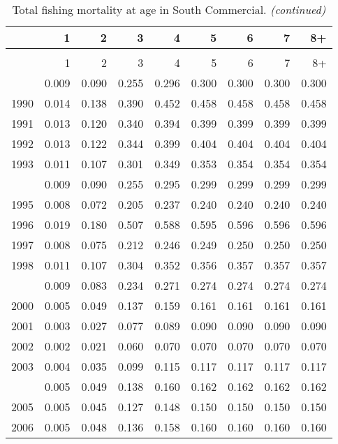 \documentclass[
]{article}
\begin{document}
\begin{longtable}[t]{lrrrrrrrr}
\caption{\label{tab:South_Commercial-fleet-FAA-table}Total fishing mortality at age in South Commercial.}\\
\toprule
  & 1 & 2 & 3 & 4 & 5 & 6 & 7 & 8+\\
\midrule
\endfirsthead
\caption[]{Total fishing mortality at age in South Commercial. \textit{(continued)}}\\
\toprule
  & 1 & 2 & 3 & 4 & 5 & 6 & 7 & 8+\\
\midrule
\endhead

\endfoot
\bottomrule
\endlastfoot
1989 & 0.009 & 0.090 & 0.255 & 0.296 & 0.300 & 0.300 & 0.300 & 0.300\\
1990 & 0.014 & 0.138 & 0.390 & 0.452 & 0.458 & 0.458 & 0.458 & 0.458\\
1991 & 0.013 & 0.120 & 0.340 & 0.394 & 0.399 & 0.399 & 0.399 & 0.399\\
1992 & 0.013 & 0.122 & 0.344 & 0.399 & 0.404 & 0.404 & 0.404 & 0.404\\
1993 & 0.011 & 0.107 & 0.301 & 0.349 & 0.353 & 0.354 & 0.354 & 0.354\\
\addlinespace
1994 & 0.009 & 0.090 & 0.255 & 0.295 & 0.299 & 0.299 & 0.299 & 0.299\\
1995 & 0.008 & 0.072 & 0.205 & 0.237 & 0.240 & 0.240 & 0.240 & 0.240\\
1996 & 0.019 & 0.180 & 0.507 & 0.588 & 0.595 & 0.596 & 0.596 & 0.596\\
1997 & 0.008 & 0.075 & 0.212 & 0.246 & 0.249 & 0.250 & 0.250 & 0.250\\
1998 & 0.011 & 0.107 & 0.304 & 0.352 & 0.356 & 0.357 & 0.357 & 0.357\\
\addlinespace
1999 & 0.009 & 0.083 & 0.234 & 0.271 & 0.274 & 0.274 & 0.274 & 0.274\\
2000 & 0.005 & 0.049 & 0.137 & 0.159 & 0.161 & 0.161 & 0.161 & 0.161\\
2001 & 0.003 & 0.027 & 0.077 & 0.089 & 0.090 & 0.090 & 0.090 & 0.090\\
2002 & 0.002 & 0.021 & 0.060 & 0.070 & 0.070 & 0.070 & 0.070 & 0.070\\
2003 & 0.004 & 0.035 & 0.099 & 0.115 & 0.117 & 0.117 & 0.117 & 0.117\\
\addlinespace
2004 & 0.005 & 0.049 & 0.138 & 0.160 & 0.162 & 0.162 & 0.162 & 0.162\\
2005 & 0.005 & 0.045 & 0.127 & 0.148 & 0.150 & 0.150 & 0.150 & 0.150\\
2006 & 0.005 & 0.048 & 0.136 & 0.158 & 0.160 & 0.160 & 0.160 & 0.160\\

\end{longtable}
\end{document}
